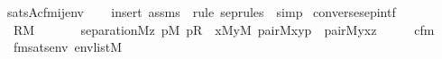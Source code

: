 \begin{isabellebody}
\ \ {\isasymlongleftrightarrow}\ sats{\isacharparenleft}{\kern0pt}A{\isacharcomma}{\kern0pt}{\isacharquery}{\kern0pt}cfm{\isacharparenleft}{\kern0pt}i{\isacharcomma}{\kern0pt}j{\isacharparenright}{\kern0pt}{\isacharcomma}{\kern0pt}env{\isacharparenright}{\kern0pt}{\isachardoublequoteclose}\isanewline
%
\isadelimproof
\ \ %
\endisadelimproof
%
\isatagproof
{}\isamarkupfalse%
\ {\isacharparenleft}{\kern0pt}insert\ assms\ {\isacharsemicolon}{\kern0pt}\ {\isacharparenleft}{\kern0pt}rule\ sep{\isacharunderscore}{\kern0pt}rules\ {\isacharbar}{\kern0pt}\ simp{\isacharparenright}{\kern0pt}{\isacharplus}{\kern0pt}{\isacharparenright}{\kern0pt}%
\endisatagproof
{\isafoldproof}%
%
\isadelimproof
\isanewline
%
\endisadelimproof
\isanewline
\isanewline
{}\isamarkupfalse%
\ converse{\isacharunderscore}{\kern0pt}sep{\isacharunderscore}{\kern0pt}intf\ {\isacharcolon}{\kern0pt}\isanewline
\ \ \isanewline
\ \ \ \ {\isachardoublequoteopen}R{\isasymin}M{\isachardoublequoteclose}\isanewline
\ \ \isanewline
\ \ \ \ {\isachardoublequoteopen}separation{\isacharparenleft}{\kern0pt}{\isacharhash}{\kern0pt}{\isacharhash}{\kern0pt}M{\isacharcomma}{\kern0pt}{\isasymlambda}z{\isachardot}{\kern0pt}\ {\isasymexists}p{\isasymin}M{\isachardot}{\kern0pt}\ p{\isasymin}R\ {\isacharampersand}{\kern0pt}\ {\isacharparenleft}{\kern0pt}{\isasymexists}x{\isasymin}M{\isachardot}{\kern0pt}{\isasymexists}y{\isasymin}M{\isachardot}{\kern0pt}\ pair{\isacharparenleft}{\kern0pt}{\isacharhash}{\kern0pt}{\isacharhash}{\kern0pt}M{\isacharcomma}{\kern0pt}x{\isacharcomma}{\kern0pt}y{\isacharcomma}{\kern0pt}p{\isacharparenright}{\kern0pt}\ {\isacharampersand}{\kern0pt}\ pair{\isacharparenleft}{\kern0pt}{\isacharhash}{\kern0pt}{\isacharhash}{\kern0pt}M{\isacharcomma}{\kern0pt}y{\isacharcomma}{\kern0pt}x{\isacharcomma}{\kern0pt}z{\isacharparenright}{\kern0pt}{\isacharparenright}{\kern0pt}{\isacharparenright}{\kern0pt}{\isachardoublequoteclose}\isanewline
%
\isadelimproof
%
\endisadelimproof
%
\isatagproof
{}\isamarkupfalse%
\ {\isacharminus}{\kern0pt}\isanewline
\ \ \isamarkupfalse%
\ cfm\ \isanewline
\ \ \ \ fmsats{\isacharcolon}{\kern0pt}{\isachardoublequoteopen}{\isasymAnd}env{\isachardot}{\kern0pt}\ env{\isasymin}list{\isacharparenleft}{\kern0pt}M{\isacharparenright}{\kern0pt}\ {\isasymLongrightarrow}\isanewline

\end{isabellebody}
